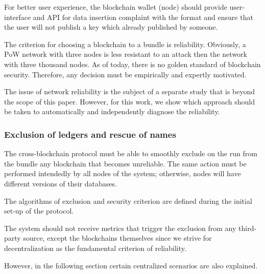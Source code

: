 \begin{multicols}{2}
For better user experience, the blockchain wallet (node) should provide user-interface and API for data insertion complaint with the format and ensure that the user will not publish a key which already published by someone.

The criterion for choosing a blockchain to a bundle is reliability. Obviously, a PoW network with three nodes is less resistant to an attack then the network with three thousand nodes. As of today, there is no golden standard of blockchain security. Therefore, any decision must be empirically and expertly motivated.

\vspace{-.1cm}
The issue of network reliability is the subject of a separate study that is beyond the scope of this paper. However, for this work, we show which approach should be taken to automatically and independently diagnose the reliability.

\vspace{-.9cm}

\subsubsection{Exclusion of ledgers and rescue of names}\label{subsubsec-4.2.c}

\vspace{-.3cm}

The cross-blockchain protocol must be able to smoothly exclude on the run from the bundle any blockchain that becomes unreliable. The same action must be performed intendedly by all nodes of the system; otherwise, nodes will have different versions of their databases. 

\vspace{-.1cm}

The algorithms of exclusion and security criterion are defined during the initial set-up of the protocol.

\vspace{-.1cm}

The system should not receive metrics that trigger the exclusion from any third-party source, except the blockchains themselves since we strive for decentralization as the fundamental criterion of reliability.

\vspace{-.1cm}

However, in the following section certain centralized scenarios are also explained. 

\vspace{-.1cm}


\end{multicols}
